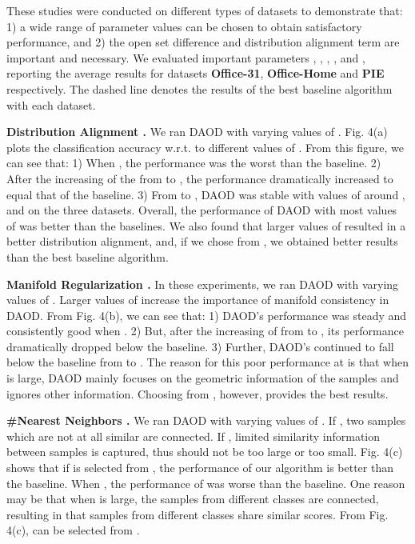 \documentclass[journal]{IEEEtran}
\begin{document}
 These studies were conducted on different types of datasets to demonstrate that: 1) a wide range of parameter values can be chosen to obtain satisfactory performance, and 2) the open set difference and distribution alignment term are important and necessary.   We evaluated important parameters , , , ,  and , reporting the average results for datasets \textbf{Office-31}, \textbf{Office-Home} and \textbf{PIE} respectively. The dashed line denotes the results of the best baseline algorithm with each dataset. 
 
 
 \textbf{{Distribution Alignment .}} We ran DAOD with varying
values of .  Fig. 4(a) plots the
classification accuracy w.r.t. to different values of . From this figure, we can see that: 1) When , the performance was the worst than the baseline. 2) After the increasing of the  from  to , the performance dramatically increased to equal that of the baseline. 3) From  to , DAOD was stable with values of around , and  on the three datasets. Overall, the performance of DAOD with most values of  was better than the baselines.  We also found that larger values of  resulted in a better distribution alignment, and, if we chose  from , we obtained better results than the best baseline algorithm.


\textbf{{Manifold Regularization .}} In these experiments, we ran DAOD with varying values of . Larger values of  increase the importance of manifold consistency in DAOD.  From Fig. 4(b), we can see that: 1)  DAOD's performance was steady and consistently good when . 2) But, after the increasing of  from  to ,  its performance dramatically dropped below the baseline. 3) Further, DAOD's continued to fall below the baseline from  to .   The reason for this poor performance at  is that when  is large, DAOD mainly focuses on the geometric information of the samples and ignores other information.  Choosing  from , however, provides the best results. 



\textbf{{\#Nearest Neighbors .}} We ran DAOD with varying values of . If , two samples which are not at all similar are connected. If , limited similarity information between samples is captured, thus  should not be too large or too small. Fig. 4(c) shows that if  is selected from , the performance of our algorithm is better than the baseline. When , the performance of  was worse than the baseline. One reason may be that when  is large, the samples from different classes are connected, resulting in that samples from different classes share similar scores. From Fig. 4(c),  can be selected from .
 
\end{document}
